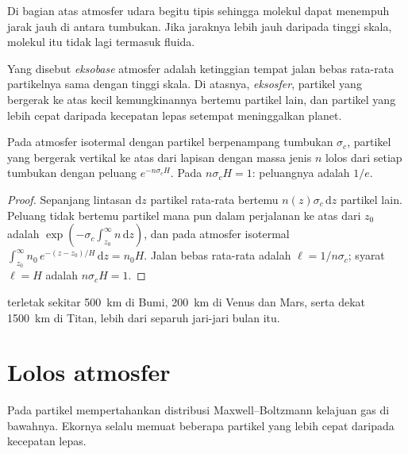 Di bagian atas atmosfer udara begitu tipis sehingga molekul dapat menempuh jarak jauh
di antara tumbukan. Jika jaraknya lebih jauh daripada tinggi skala, molekul itu tidak
lagi termasuk fluida.

\begin{definition}\label{def:b3:planetary-atmospheres:exobase}
Yang disebut \emph{eksobase} atmosfer adalah ketinggian tempat
jalan bebas rata-rata partikelnya sama dengan tinggi skala. Di atasnya,
\emph{eksosfer}, partikel yang bergerak ke atas kecil
kemungkinannya bertemu partikel lain, dan partikel yang lebih cepat daripada
kecepatan lepas setempat meninggalkan planet.
\end{definition}

\begin{proposition}\label{prop:b3:planetary-atmospheres:exobase}
Pada atmosfer isotermal dengan partikel berpenampang tumbukan
$\sigma_c$, partikel yang bergerak vertikal ke atas dari lapisan dengan massa jenis
$n$ lolos dari setiap tumbukan dengan peluang $e^{-n\sigma_c H}$. Pada
 $n\sigma_c H = 1$: peluangnya adalah $1/e$.
\end{proposition}

\begin{proof}
Sepanjang lintasan $\mathrm dz$ partikel rata-rata bertemu $n(z)\sigma_c\,
\mathrm dz$ partikel lain. Peluang tidak bertemu partikel mana pun dalam perjalanan ke atas dari
$z_0$ adalah $\exp(-\sigma_c\int_{z_0}^\infty n\,\mathrm dz)$, dan pada
atmosfer isotermal $\int_{z_0}^\infty n_0\,e^{-(z-z_0)/H}\,\mathrm dz
= n_0 H$. Jalan bebas rata-rata adalah $\ell = 1/n\sigma_c$; syarat $\ell
= H$ adalah $n\sigma_c H = 1$.
\end{proof}

 terletak sekitar \qty{500}{km} di Bumi, \qty{200}{km} di
Venus dan Mars, serta dekat \qty{1500}{km} di Titan, lebih dari separuh
jari-jari bulan itu.

\section{Lolos atmosfer}\label{sec:b3:planetary-atmospheres:escape}

Pada  partikel mempertahankan distribusi Maxwell--Boltzmann
kelajuan gas di bawahnya. Ekornya selalu memuat beberapa partikel yang lebih cepat daripada
kecepatan lepas.

